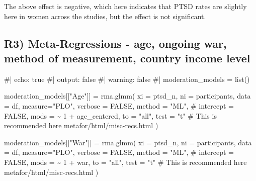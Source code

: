 \documentclass[
  letterpaper,
  DIV=11,
  numbers=noendperiod]{scrartcl}
\newenvironment{Shaded}{\begin{snugshade}}{\end{snugshade}}
\newcommand{\AttributeTok}[1]{\textcolor[rgb]{0.40,0.45,0.13}{#1}}
\newcommand{\CommentTok}[1]{\textcolor[rgb]{0.37,0.37,0.37}{#1}}
\newcommand{\ConstantTok}[1]{\textcolor[rgb]{0.56,0.35,0.01}{#1}}
\newcommand{\DecValTok}[1]{\textcolor[rgb]{0.68,0.00,0.00}{#1}}
\newcommand{\FunctionTok}[1]{\textcolor[rgb]{0.28,0.35,0.67}{#1}}
\newcommand{\NormalTok}[1]{\textcolor[rgb]{0.00,0.23,0.31}{#1}}
\newcommand{\OtherTok}[1]{\textcolor[rgb]{0.00,0.23,0.31}{#1}}
\newcommand{\SpecialCharTok}[1]{\textcolor[rgb]{0.37,0.37,0.37}{#1}}
\newcommand{\StringTok}[1]{\textcolor[rgb]{0.13,0.47,0.30}{#1}}
\begin{document}
The above effect is negative, which here indicates that PTSD rates are
slightly here in women across the studies, but the effect is not
significant.

\subsection{R3) Meta-Regressions - age, ongoing war, method of
measurement, country income
level}\label{r3-meta-regressions---age-ongoing-war-method-of-measurement-country-income-level}

\begin{Shaded}
\begin{Highlighting}[]
\CommentTok{\#| echo: true}
\CommentTok{\#| output: false}
\CommentTok{\#| warning: false}
\CommentTok{\#|}
\NormalTok{moderation\_models }\OtherTok{=} \FunctionTok{list}\NormalTok{()}

\NormalTok{moderation\_models[[}\StringTok{"Age"}\NormalTok{]] }\OtherTok{=} \FunctionTok{rma.glmm}\NormalTok{(}
  \AttributeTok{xi =} \StringTok{\textasciigrave{}}\AttributeTok{ptsd\_n}\StringTok{\textasciigrave{}}\NormalTok{, }
  \AttributeTok{ni =} \StringTok{\textasciigrave{}}\AttributeTok{participants}\StringTok{\textasciigrave{}}\NormalTok{, }
  \AttributeTok{data =}\NormalTok{ df, }
  \AttributeTok{measure=}\StringTok{"PLO"}\NormalTok{,}
  \AttributeTok{verbose =} \ConstantTok{FALSE}\NormalTok{,}
  \AttributeTok{method =} \StringTok{"ML"}\NormalTok{,}
  \CommentTok{\# intercept = FALSE,}
  \AttributeTok{mods =} \SpecialCharTok{\textasciitilde{}} \DecValTok{1} \SpecialCharTok{+}\NormalTok{ age\_centered,}
  \AttributeTok{to =} \StringTok{"all"}\NormalTok{,}
  \AttributeTok{test =} \StringTok{"t"} \CommentTok{\# This is recommended here metafor/html/misc{-}recs.html}
\NormalTok{)}

\NormalTok{moderation\_models[[}\StringTok{"War"}\NormalTok{]] }\OtherTok{=} \FunctionTok{rma.glmm}\NormalTok{(}
  \AttributeTok{xi =} \StringTok{\textasciigrave{}}\AttributeTok{ptsd\_n}\StringTok{\textasciigrave{}}\NormalTok{, }
  \AttributeTok{ni =} \StringTok{\textasciigrave{}}\AttributeTok{participants}\StringTok{\textasciigrave{}}\NormalTok{, }
  \AttributeTok{data =}\NormalTok{ df, }
  \AttributeTok{measure=}\StringTok{"PLO"}\NormalTok{,}
  \AttributeTok{verbose =} \ConstantTok{FALSE}\NormalTok{,}
  \AttributeTok{method =} \StringTok{"ML"}\NormalTok{,}
  \CommentTok{\# intercept = FALSE,}
  \AttributeTok{mods =} \SpecialCharTok{\textasciitilde{}} \DecValTok{1} \SpecialCharTok{+}\NormalTok{ war,}
  \AttributeTok{to =} \StringTok{"all"}\NormalTok{,}
  \AttributeTok{test =} \StringTok{"t"} \CommentTok{\# This is recommended here metafor/html/misc{-}recs.html}
\NormalTok{)}


\end{Highlighting}
\end{Shaded}
\end{document}
